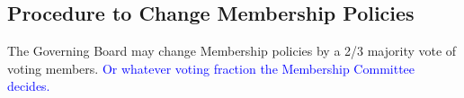 \subsection{Procedure to Change Membership Policies}

The Governing Board may change Membership policies by a 2/3 majority vote of voting members. \textcolor{blue}{Or whatever voting fraction the Membership Committee decides.}  












